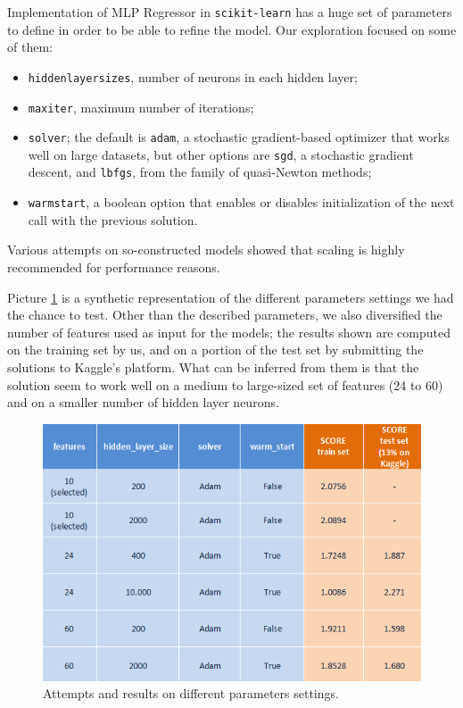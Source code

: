 Implementation of MLP Regressor in \texttt{scikit-learn} has a huge set of parameters to define in order to be able to refine the model.
Our exploration focused on some of them:
\begin{itemize}
	\item \texttt{hidden\textunderscore layer\textunderscore sizes}, number of neurons in each hidden layer;
	\item \texttt{max\textunderscore iter}, maximum number of iterations;
	\item \texttt{solver}; the default is \texttt{adam}, a stochastic gradient-based optimizer that works well on large datasets, but other options are \texttt{sgd}, a stochastic gradient descent, and \texttt{lbfgs}, from the family of quasi-Newton methods;
	\item \texttt{warm\textunderscore start}, a boolean option that enables or disables initialization of the next call with the previous solution.
\end{itemize}
Various attempts on so-constructed models showed that scaling is highly recommended for performance reasons.

Picture \ref{fig:NNtries} is a synthetic representation of the different parameters settings we had the chance to test. Other than the described parameters, we also diversified the number of features used as input for the models; the results shown are computed on the training set by us, and on a portion of the test set by submitting the solutions to Kaggle's platform. What can be inferred from them is that the solution seem to work well on a medium to large-sized set of features (24 to 60) and on a smaller number of hidden layer neurons.

\begin{figure} [h]
	\centering
	\includegraphics[width=0.9\linewidth]{pictures/graph.png}
	\caption{Attempts and results on different parameters settings.}
	\label{fig:NNtries}
\end{figure}

